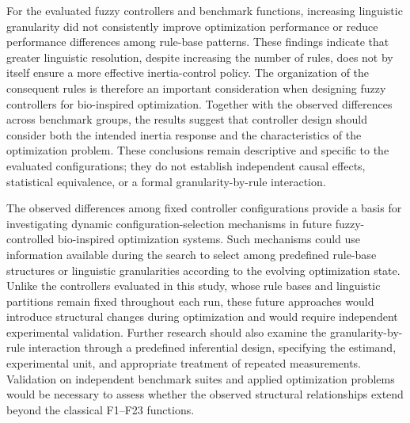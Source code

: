 For the evaluated fuzzy controllers and benchmark functions, increasing linguistic granularity did not consistently improve optimization performance or reduce performance differences among rule-base patterns. These findings indicate that greater linguistic resolution, despite increasing the number of rules, does not by itself ensure a more effective inertia-control policy. The organization of the consequent rules is therefore an important consideration when designing fuzzy controllers for bio-inspired optimization. Together with the observed differences across benchmark groups, the results suggest that controller design should consider both the intended inertia response and the characteristics of the optimization problem. These conclusions remain descriptive and specific to the evaluated configurations; they do not establish independent causal effects, statistical equivalence, or a formal granularity-by-rule interaction.


The observed differences among fixed controller configurations provide a basis for investigating dynamic configuration-selection mechanisms in future fuzzy-controlled bio-inspired optimization systems. Such mechanisms could use information available during the search to select among predefined rule-base structures or linguistic granularities according to the evolving optimization state. Unlike the controllers evaluated in this study, whose rule bases and linguistic partitions remain fixed throughout each run, these future approaches would introduce structural changes during optimization and would require independent experimental validation. Further research should also examine the granularity-by-rule interaction through a predefined inferential design, specifying the estimand, experimental unit, and appropriate treatment of repeated measurements. Validation on independent benchmark suites and applied optimization problems would be necessary to assess whether the observed structural relationships extend beyond the classical F1--F23 functions.

